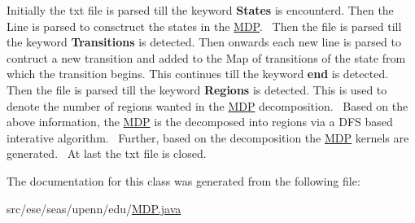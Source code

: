 Initially the txt file is parsed till the keyword {\bfseries States} is encounterd. Then the Line is parsed to consctruct the states in the \hyperlink{classese_1_1seas_1_1upenn_1_1edu_1_1_m_d_p}{M\+D\+P}.~\newline
 Then the file is parsed till the keyword {\bfseries Transitions} is detected. Then onwards each new line is parsed to contruct a new transition and added to the Map of transitions of the state from which the transition begins. This continues till the keyword {\bfseries end} is detected.~\newline
 Then the file is parsed till the keyword {\bfseries Regions} is detected. This is used to denote the number of regions wanted in the \hyperlink{classese_1_1seas_1_1upenn_1_1edu_1_1_m_d_p}{M\+D\+P} decomposition.~\newline
 Based on the above information, the \hyperlink{classese_1_1seas_1_1upenn_1_1edu_1_1_m_d_p}{M\+D\+P} is the decomposed into regions via a D\+F\+S based interative algorithm.~\newline
 Further, based on the decomposition the \hyperlink{classese_1_1seas_1_1upenn_1_1edu_1_1_m_d_p}{M\+D\+P} kernels are generated.~\newline
 At last the txt file is closed.~\newline
 

The documentation for this class was generated from the following file\+:\begin{DoxyCompactItemize}
\item 
src/ese/seas/upenn/edu/\hyperlink{_m_d_p_8java}{M\+D\+P.\+java}\end{DoxyCompactItemize}
